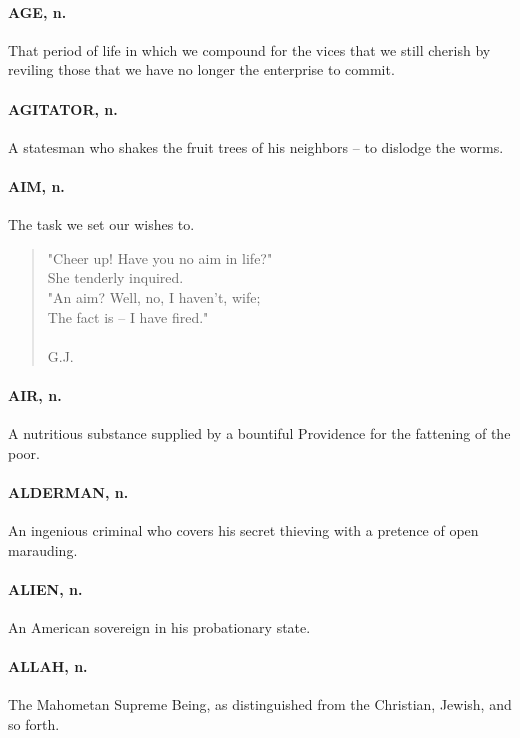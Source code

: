 \documentclass[11pt]{article}
\begin{document}
\paragraph{AGE, n.}  That period of life in which we compound for the vices that
we still cherish by reviling those that we have no longer the
enterprise to commit.

\paragraph{AGITATOR, n.}  A statesman who shakes the fruit trees of his neighbors
-- to dislodge the worms.

\paragraph{AIM, n.}  The task we set our wishes to.
\begin{quote}   "Cheer up!  Have you no aim in life?" \\
      She tenderly inquired. \\
  "An aim?  Well, no, I haven't, wife; \\
      The fact is -- I have fired." \\
 \\
G.J. \end{quote}


\paragraph{AIR, n.}  A nutritious substance supplied by a bountiful Providence for
the fattening of the poor.

\paragraph{ALDERMAN, n.}  An ingenious criminal who covers his secret thieving
with a pretence of open marauding.

\paragraph{ALIEN, n.}  An American sovereign in his probationary state.

\paragraph{ALLAH, n.}  The Mahometan Supreme Being, as distinguished from the
Christian, Jewish, and so forth.
\end{document}
